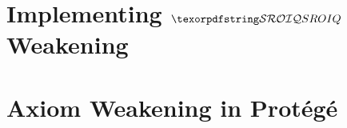 

\section{Implementing \texorpdfstring{$\SROIQ$}{SROIQ} Weakening}



\section{Axiom Weakening in Protégé}\label{protege}


